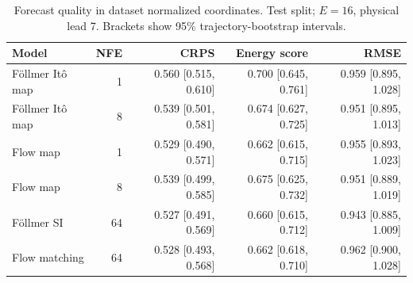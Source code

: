 \begin{table}[t]
\centering
\small
\setlength{\tabcolsep}{3pt}
\caption{Forecast quality in dataset normalized coordinates. Test split; $E=16$, physical lead 7. Brackets show 95\% trajectory-bootstrap intervals.}
\label{tab:map-quality}
\begin{tabular}{lrrrr}
\toprule
Model & NFE & CRPS & Energy score & RMSE \\
\midrule
Föllmer Itô map & 1 & 0.560 [0.515, 0.610] & 0.700 [0.645, 0.761] & 0.959 [0.895, 1.028] \\
Föllmer Itô map & 8 & 0.539 [0.501, 0.581] & 0.674 [0.627, 0.725] & 0.951 [0.895, 1.013] \\
\addlinespace
Flow map & 1 & 0.529 [0.490, 0.571] & 0.662 [0.615, 0.715] & 0.955 [0.893, 1.023] \\
Flow map & 8 & 0.539 [0.499, 0.585] & 0.675 [0.625, 0.732] & 0.951 [0.889, 1.019] \\
\addlinespace
Föllmer SI & 64 & 0.527 [0.491, 0.569] & 0.660 [0.615, 0.712] & 0.943 [0.885, 1.009] \\
\addlinespace
Flow matching & 64 & 0.528 [0.493, 0.568] & 0.662 [0.618, 0.710] & 0.962 [0.900, 1.028] \\
\bottomrule
\end{tabular}
\end{table}
